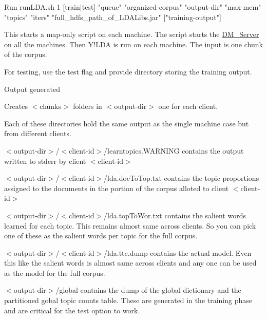 \begin{DoxyEnumerate}
\begin{DoxyEnumerate}
\begin{DoxyEnumerate}
Run {\ttfamily runLDA.sh 1 \mbox{[}train$|$test\mbox{]} "queue" "organized-\/corpus" "output-\/dir" "max-\/mem" "topics" "iters" "full\_\-hdfs\_\-path\_\-of\_\-LDALibs.jar" \mbox{[}"training-\/output"\mbox{]} }  
\item 

This starts a map-\/only script on each machine. The script starts the \hyperlink{class_d_m___server}{DM\_\-Server} on all the machines. Then Y!LDA is run on each machine. The input is one chunk of the corpus. 
\item 

For testing, use the test flag and provide directory storing the training output. 
\end{DoxyEnumerate}
\item 

Output generated 
\begin{DoxyEnumerate}
\item 

Creates $<$chunks$>$ folders in $<$output-\/dir$>$ one for each client.  
\item 

Each of these directories hold the same output as the single machine case but from different clients.  
\item 

$<$output-\/dir$>$/$<$client-\/id$>$/learntopics.WARNING contains the output written to stderr by client $<$client-\/id$>$ 
\item 

$<$output-\/dir$>$/$<$client-\/id$>$/lda.docToTop.txt contains the topic proportions assigned to the documents in the portion of the corpus alloted to client $<$client-\/id$>$ 
\item 

$<$output-\/dir$>$/$<$client-\/id$>$/lda.topToWor.txt contains the salient words learned for each topic. This remains almost same across clients. So you can pick one of these as the salient words per topic for the full corpus. 
\item 

$<$output-\/dir$>$/$<$client-\/id$>$/lda.ttc.dump contains the actual model. Even this like the salient words is almost same across clients and any one can be used as the model for the full corpus. 
\item 

$<$output-\/dir$>$/global contains the dump of the global dictionary and the partitioned gobal topic counts table. These are generated in the training phase and are critical for the test option to work. 
\end{DoxyEnumerate}
\item 


\end{DoxyEnumerate}
\end{DoxyEnumerate}

